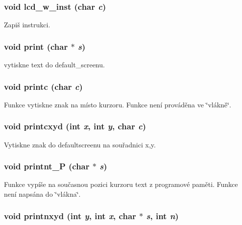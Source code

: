 \subsubsection[{lcd\_\-w\_\-inst}]{\setlength{\rightskip}{0pt plus 5cm}void lcd\_\-w\_\-inst (char {\em c})}\label{lcd_8h_a98e19b75c7263dd914e04a630f43cde1}


Zapiš instrukci. 
\subsubsection[{print}]{\setlength{\rightskip}{0pt plus 5cm}void print (char $\ast$ {\em s})}\label{lcd_8h_a51283220f829206d8ef3284047a58fbd}


vytiskne text do default\_\-screenu. 
\subsubsection[{printc}]{\setlength{\rightskip}{0pt plus 5cm}void printc (char {\em c})}\label{lcd_8h_a7ead26e52916805b53cb705997cb90bb}
Funkce vytiskne znak na místo kurzoru. Funkce není prováděna ve \char`\"{}vlákně\char`\"{}. 
\subsubsection[{printcxyd}]{\setlength{\rightskip}{0pt plus 5cm}void printcxyd (int {\em x}, \/  int {\em y}, \/  char {\em c})}\label{lcd_8h_a73a10b7ac5330a420af6e1f443506937}


Vytiskne znak do defaultscreenu na souřadnici x,y. 
\subsubsection[{printnt\_\-P}]{\setlength{\rightskip}{0pt plus 5cm}void printnt\_\-P (char $\ast$ {\em s})}\label{lcd_8h_aa4fa8c7956bc27eae6a818d41199691f}
Funkce vypíše na současnou pozici kurzoru text z programové paměti. Funkce není napsána do \char`\"{}vlákna\char`\"{}. 
\subsubsection[{printnxyd}]{\setlength{\rightskip}{0pt plus 5cm}void printnxyd (int {\em y}, \/  int {\em x}, \/  char $\ast$ {\em s}, \/  int {\em n})}\label{lcd_8h_a9b70b5f13bd19a1a5ff3de4221c1dc72}


